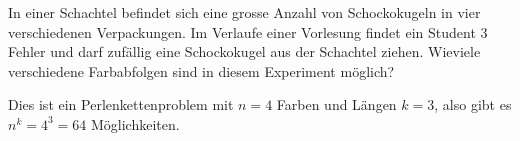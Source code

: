 In einer Schachtel befindet sich eine grosse Anzahl von Schockokugeln
in vier verschiedenen Verpackungen.
Im Verlaufe einer Vorlesung findet ein Student 3 Fehler und darf zufällig
eine Schockokugel aus der Schachtel ziehen.
Wieviele verschiedene Farbabfolgen sind in diesem Experiment möglich?

\begin{loesung}
Dies ist ein Perlenkettenproblem mit $n=4$ Farben und Längen $k=3$, also
gibt es $n^k=4^3 = 64$ Möglichkeiten.
\end{loesung}


